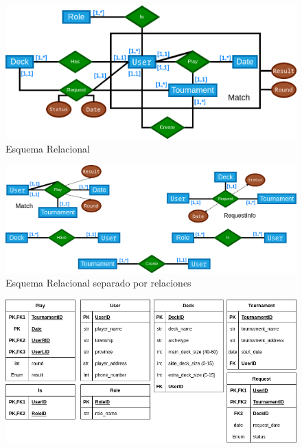 \documentclass[a4paper]{article}
\begin{document}
\begin{figure}[h]
  \centering
  \includegraphics[width=1\textwidth]{merx.png}
  \caption{Esquema Relacional}
  \label{fig:etiqueta}
\end{figure}
\begin{figure}[h]
  \centering
  \includegraphics[width=1\textwidth]{relations.png}
  \caption{Esquema Relacional separado por relaciones}
  \label{fig:etiqueta}
\end{figure}

\begin{figure}[h]
  \centering
  \includegraphics[width=1\textwidth]{table.png}
  \label{fig:etiqueta}
\end{figure}
\end{document}
